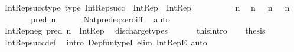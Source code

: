 \begin{isabellebody}
\isamarkupfalse%
\ Int{\isacharunderscore}{\kern0pt}Rep{\isacharunderscore}{\kern0pt}succ{\isacharunderscore}{\kern0pt}type\ {\isacharbrackleft}{\kern0pt}type{\isacharbrackright}{\kern0pt}{\isacharcolon}{\kern0pt}\ {\isachardoublequoteopen}Int{\isacharunderscore}{\kern0pt}Rep{\isacharunderscore}{\kern0pt}succ\ {\isacharcolon}{\kern0pt}\ Int{\isacharunderscore}{\kern0pt}Rep\ {\isasymRightarrow}\ Int{\isacharunderscore}{\kern0pt}Rep{\isachardoublequoteclose}\isanewline
%
\isadelimproof
%
\endisadelimproof
%
\isatagproof
{}\isamarkupfalse%
\ {\isacharminus}{\kern0pt}\isanewline
\ \ \isacommand{{\isacharbraceleft}{\kern0pt}}\isamarkupfalse%
\isanewline
\ \ \ \ \isamarkupfalse%
\ n\ \isamarkupfalse%
\ {\isachardoublequoteopen}n\ {\isasymin}\ {\isasymnat}{\isachardoublequoteclose}\ {\isachardoublequoteopen}n\ {\isasymnoteq}\ {}{\isachardoublequoteclose}\ {\isachardoublequoteopen}n\ {\isasymnoteq}\ {}{\isachardoublequoteclose}\isanewline
\ \ \ \ \isamarkupfalse%
\ \isamarkupfalse%
\ {\isachardoublequoteopen}pred\ n\ {\isasymin}\ {\isasymnat}\ {\isasymsetminus}\ {\isacharbraceleft}{\kern0pt}{}{\isacharbraceright}{\kern0pt}{\isachardoublequoteclose}\ \isamarkupfalse%
\ Nat{\isacharunderscore}{\kern0pt}pred{\isacharunderscore}{\kern0pt}eq{\isacharunderscore}{\kern0pt}zero{\isacharunderscore}{\kern0pt}iff\ \isamarkupfalse%
\ auto\isanewline
\ \ \ \ \isamarkupfalse%
\ \isamarkupfalse%
\ {\isachardoublequoteopen}Int{\isacharunderscore}{\kern0pt}Rep{\isacharunderscore}{\kern0pt}neg\ {\isacharparenleft}{\kern0pt}pred\ n{\isacharparenright}{\kern0pt}\ {\isacharcolon}{\kern0pt}\ Int{\isacharunderscore}{\kern0pt}Rep{\isachardoublequoteclose}\ \isamarkupfalse%
\ discharge{\isacharunderscore}{\kern0pt}types\isanewline
\ \ \isacommand{{\isacharbraceright}{\kern0pt}}\isamarkupfalse%
\isanewline
\ \ \isamarkupfalse%
\ this{\isacharbrackleft}{\kern0pt}intro{\isacharbrackright}{\kern0pt}\isanewline
\ \ \isamarkupfalse%
\ {\isacharquery}{\kern0pt}thesis\isanewline
\ \ \ \ \isamarkupfalse%
\ Int{\isacharunderscore}{\kern0pt}Rep{\isacharunderscore}{\kern0pt}succ{\isacharunderscore}{\kern0pt}def\ \isamarkupfalse%
\ {\isacharparenleft}{\kern0pt}intro\ Dep{\isacharunderscore}{\kern0pt}fun{\isacharunderscore}{\kern0pt}typeI{\isacharcomma}{\kern0pt}\ elim\ Int{\isacharunderscore}{\kern0pt}RepE{\isacharparenright}{\kern0pt}\ auto\isanewline

\end{isabellebody}

